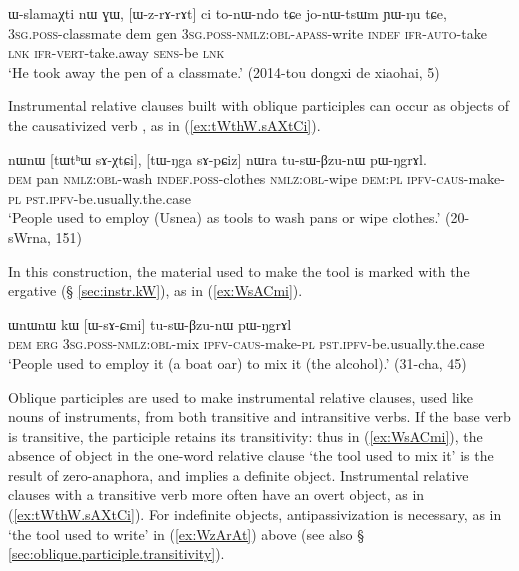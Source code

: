 \begin{exe}
\ex \label{ex:WzArAt}
\gll ɯ-slamaχti nɯ ɣɯ, [ɯ-z-rɤ-rɤt] ci to-nɯ-ndo tɕe jo-nɯ-tsɯm ɲɯ-ŋu tɕe, \\
\textsc{3sg}.\textsc{poss}-classmate dem gen \textsc{3sg}.\textsc{poss}-\textsc{nmlz}:\textsc{obl}-\textsc{apass}-write \textsc{indef} \textsc{ifr}-\textsc{auto}-take \textsc{lnk} \textsc{ifr}-\textsc{vert}-take.away \textsc{sens}-be \textsc{lnk} \\
\glt `He took away the pen of a classmate.' (2014-tou dongxi de xiaohai, 5)
\end{exe}

Instrumental relative clauses built with oblique participles can occur as objects of the causativized verb , as in (\ref{ex:tWthW.sAXtCi}).

\begin{exe}
\ex \label{ex:tWthW.sAXtCi}
\gll nɯnɯ [tɯtʰɯ sɤ-χtɕi], [tɯ-ŋga sɤ-pɕiz] nɯra tu-sɯ-βzu-nɯ pɯ-ŋgrɤl. \\
\textsc{dem} pan \textsc{nmlz}:\textsc{obl}-wash \textsc{indef}.\textsc{poss}-clothes \textsc{nmlz}:\textsc{obl}-wipe \textsc{dem}:\textsc{pl} \textsc{ipfv}-\textsc{caus}-make-\textsc{pl} \textsc{pst}.\textsc{ipfv}-be.usually.the.case \\
\glt `People used to employ (Usnea) as tools to wash pans or wipe clothes.' (20-sWrna, 151)
\end{exe} 

In this construction, the material used to make the tool is marked with the ergative (§ \ref{sec:instr.kW}), as in (\ref{ex:WsACmi}).

\begin{exe}
\ex \label{ex:WsACmi}
\gll ɯnɯnɯ kɯ [ɯ-sɤ-ɕmi] tu-sɯ-βzu-nɯ pɯ-ŋgrɤl \\
\textsc{dem} \textsc{erg} \textsc{3sg}.\textsc{poss}-\textsc{nmlz}:\textsc{obl}-mix \textsc{ipfv}-\textsc{caus}-make-\textsc{pl} \textsc{pst}.\textsc{ipfv}-be.usually.the.case \\
\glt `People used to employ it (a boat oar) to mix it (the alcohol).' (31-cha, 45)
\end{exe}  

Oblique participles are used to make instrumental relative clauses, used like nouns of instruments, from both transitive and intransitive verbs. If the base verb is transitive, the participle retains its transitivity: thus in (\ref{ex:WsACmi}), the absence of object in the one-word relative clause  `the tool used to mix it' is the result of zero-anaphora, and implies a definite object. Instrumental relative clauses with a transitive verb more often have an overt object, as in (\ref{ex:tWthW.sAXtCi}). For indefinite objects, antipassivization is necessary, as in  `the tool used to write' in (\ref{ex:WzArAt}) above (see also  § \ref{sec:oblique.participle.transitivity}). 

